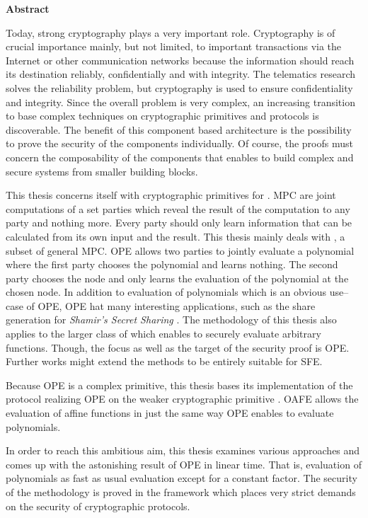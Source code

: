 \noindent{}\textsf{\textbf{\huge Abstract}}

\bigskip{}

\noindent{}Today, strong cryptography plays a very important role. Cryptography
is of crucial importance mainly, but not limited, to important transactions via
the Internet or other communication networks because the information should
reach its destination reliably, confidentially and with integrity. The
telematics research solves the reliability problem, but cryptography is used to
ensure confidentiality and integrity. Since the overall problem is very complex,
an increasing transition to base complex techniques on cryptographic primitives
and protocols is discoverable. The benefit of this component based architecture
is the possibility to prove the security of the components individually. Of
course, the proofs must concern the composability of the components that enables
to build complex and secure systems from smaller building blocks.

This thesis concerns itself with cryptographic primitives for . MPC are joint computations of a set parties
which reveal the result of the computation to any party and nothing more. Every
party should only learn information that can be calculated from its own input
and the result. This thesis mainly deals with , a subset of general MPC. OPE allows two parties to jointly
evaluate a polynomial where the first party chooses the polynomial and learns
nothing. The second party chooses the node and only learns the evaluation of the
polynomial at the chosen node. In addition to evaluation of polynomials which
is an obvious use--case of OPE, OPE hat many interesting applications, such as
the share generation for \emph{Shamir's Secret Sharing} \cite{shamir79}. The
methodology of this thesis also applies to the larger class of  which enables to securely evaluate arbitrary
functions. Though, the focus as well as the target of the security proof is OPE.
Further works might extend the methods to be entirely suitable for SFE.

Because OPE is a complex primitive, this thesis bases its implementation of the
protocol realizing OPE on the weaker cryptographic primitive . OAFE allows the evaluation of affine
functions in just the same way OPE enables to evaluate polynomials.

In order to reach this ambitious aim, this thesis examines various approaches
and comes up with the astonishing result of OPE in linear time. That is,
evaluation of polynomials as fast as usual evaluation except for a constant
factor. The security of the methodology is proved in the  framework \cite{canetti05} which places very strict demands
on the security of cryptographic protocols.


